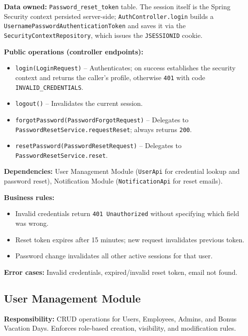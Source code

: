 \documentclass[11pt,a4paper]{article}
\begin{document}
\textbf{Data owned:} \texttt{Password\_reset\_token} table. The session itself is the Spring Security context persisted server-side; \texttt{AuthController.login} builds a \texttt{UsernamePasswordAuthenticationToken} and saves it via the \texttt{SecurityContextRepository}, which issues the \texttt{JSESSIONID} cookie.

\textbf{Public operations (controller endpoints):}
\begin{itemize}[leftmargin=1.5em]
    \item \texttt{login(LoginRequest)} -- Authenticates; on success establishes the security context and returns the caller's profile, otherwise \texttt{401} with code \texttt{INVALID\_CREDENTIALS}.
    \item \texttt{logout()} -- Invalidates the current session.
    \item \texttt{forgotPassword(PasswordForgotRequest)} -- Delegates to \texttt{PasswordResetService.requestReset}; always returns \texttt{200}.
    \item \texttt{resetPassword(PasswordResetRequest)} -- Delegates to \texttt{PasswordResetService.reset}.
\end{itemize}

\textbf{Dependencies:} User Management Module (\texttt{UserApi} for credential lookup and password reset), Notification Module (\texttt{NotificationApi} for reset emails).

\textbf{Business rules:}
\begin{itemize}[leftmargin=1.5em]
    \item Invalid credentials return \texttt{401 Unauthorized} without specifying which field was wrong.
    \item Reset token expires after 15 minutes; new request invalidates previous token.
    \item Password change invalidates all other active sessions for that user.
\end{itemize}

\textbf{Error cases:} Invalid credentials, expired/invalid reset token, email not found.

\subsection{User Management Module}

\textbf{Responsibility:} CRUD operations for Users, Employees, Admins, and Bonus Vacation Days. Enforces role-based creation, visibility, and modification rules.
\end{document}
